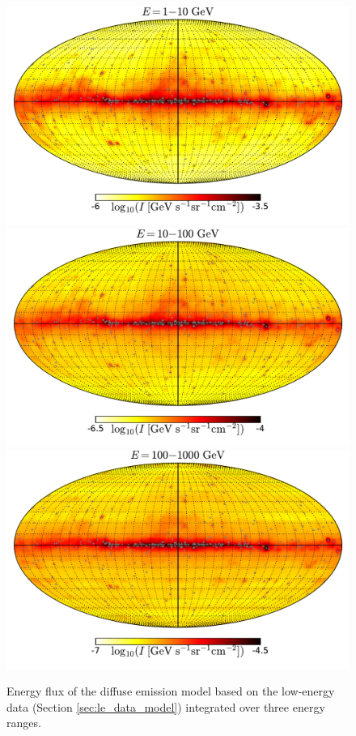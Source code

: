 \begin{figure}[t]
\includegraphics[width=\threepic\textwidth]{plots/Mollweide_LowE_model_0p3-1p0GeV_flux_source_range_0_log.pdf}
\includegraphics[width=\threepic\textwidth]{plots/Mollweide_LowE_model_0p3-1p0GeV_flux_source_range_1_log.pdf}
\includegraphics[width=\threepic\textwidth]{plots/Mollweide_LowE_model_0p3-1p0GeV_flux_source_range_2_log.pdf}
\caption{Energy flux of the diffuse emission model based on the low-energy data (Section \ref{sec:le_data_model})
integrated over three energy ranges. }
\label{fig:Maps_lowE_model}
\end{figure}


